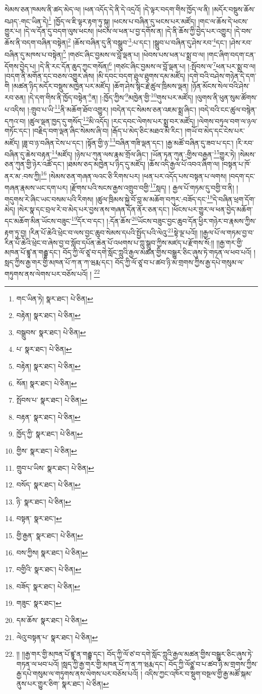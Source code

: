 སེམས་ཅན་ཁམས་ནི་ཚད་མེད་ལ། །ཕན་འདོད་དེ་ནི་དེ་འདྲའོ། །དེ་ལྟར་བདག་གིས་ཁྱོད་ལ་ནི། །མདོར་བསྡུས་ཆོས་བཤད་:གང་ཡིན་དེ།\footnote{གང་ཡིན་ཏེ།  སྣར་ཐང་།  པེ་ཅིན། } །ཁྱོད་ལ་ཇི་ལྟར་རྟག་ཏུ་སྐུ། །ཕངས་པ་བཞིན་དུ་ཕངས་པར་མཛོད། །གང་ལ་ཆོས་དེ་ཕངས་གྱུར་པ། །དེ་ལ་དོན་དུ་བདག་ལུས་ཕངས། །ཕངས་ལ་ཕན་པ་བྱ་དགོས་ན། །དེ་ནི་ཆོས་ཀྱི་བྱེད་པར་འགྱུར། །དེ་བས་ཆོས་ནི་བདག་བཞིན་བསྟེན།\footnote{བརྟེན།  སྣར་ཐང་།  པེ་ཅིན། } །ཆོས་བཞིན་དུ་ནི་བསྒྲུབ་\footnote{བསྒྲུབས་  སྣར་ཐང་།  པེ་ཅིན། }:པ་དང་། །སྒྲུབ་པ་བཞིན་དུ་ཤེས་རབ་\footnote{པ་  སྣར་ཐང་།  པེ་ཅིན། }དང་། །ཤེས་རབ་བཞིན་དུ་མཁས་པ་བསྟེན།\footnote{བརྟེན།  སྣར་ཐང་།  པེ་ཅིན། } །གཙང་ཞིང་བྱམས་ལ་བློ་ལྡན་པ། །ཕེབས་པས་ཕན་པ་སྨྲ་བ་ལ། །གང་ཞིག་བདག་ངན་དོགས་བྱེད་པ། །དེ་ནི་རང་དོན་ཆུད་ཀྱང་གསོན།\footnote{སོན།  སྣར་ཐང་།  པེ་ཅིན། } །གཙང་ཞིང་བྱམས་ལ་བློ་ལྡན་པ། །:སྤོབས་ལ་\footnote{སྤོབས་པ་  སྣར་ཐང་།  པེ་ཅིན། }ཕན་པར་སྨྲ་བ་ལ། །བདག་ནི་མགོན་དང་བཅས་འགྱུར་ཞེས། །མི་དབང་བདག་ཐུལ་ཐུགས་དམ་མཛོད། །དགེ་བའི་བཤེས་གཉེན་དེ་དག་གི །མཚན་ཉིད་མདོར་བསྡུས་མཁྱེན་པར་མཛོད། །ཆོག་ཤེས་སྙིང་རྗེ་ཚུལ་ཁྲིམས་ལྡན། །ཉོན་མོངས་སེལ་བའི་ཤེས་རབ་ཅན། །དེ་དག་གིས་ནི་ཁྱོད་བསྟེན་\footnote{བརྟན་  སྣར་ཐང་།  པེ་ཅིན། }ན། །:ཁྱོད་ཀྱིས་\footnote{ཁྱོད་ཀྱི་  སྣར་ཐང་།  པེ་ཅིན། }མཁྱེན་གྱི་\footnote{གྱིས་  སྣར་ཐང་།  པེ་ཅིན། }གུས་པར་མཛོད། །ལུགས་ནི་ཕུན་སུམ་ཚོགས་པ་འདིས། །:གྲུབ་པ་ཡི་\footnote{གྲུབ་པ་ཡིས་  སྣར་ཐང་།  པེ་ཅིན། }ནི་མཆོག་ཐོབ་འགྱུར། །བདེན་དང་སེམས་ཅན་འཇམ་སྨྲ་ཞིང་། །བདེ་བའི་ངང་ཚུལ་བསྙེན་དཀའ་བ། །ཚུལ་ལྡན་ཁྱད་དུ་གསོད་\footnote{བསོད་  སྣར་ཐང་།  པེ་ཅིན། }མི་འདོད། །རང་དབང་ལེགས་པར་སྨྲ་བར་མཛོད། །ལེགས་བཏུལ་བག་ལ་ཉལ་གཏོང་དང་། །བརྗིད་བག་ལྡན་ཞིང་སེམས་ཞི་བ། །རྒོད་པ་མེད་ཅིང་མཐའ་མི་རིང་། །གཡོ་བ་མེད་དང་ངེས་པར་མཛོད། །ཟླ་བ་ཉ་བཞིན་ངེས་པ་དང་། །སྟོན་གྱི་ཉ་\footnote{ཉི་  སྣར་ཐང་།  པེ་ཅིན། }བཞིན་གཟི་ལྡན་དང་། །རྒྱ་མཚོ་བཞིན་དུ་ཟབ་པ་དང་། །རི་རབ་བཞིན་དུ་ཆེས་བརྟན་\footnote{བསྟན་  སྣར་ཐང་། }མཛོད། །ཉེས་པ་ཀུན་ལས་རྣམ་གྲོལ་ཞིང་། །ཡོན་ཏན་ཀུན་:གྱིས་བརྒྱན་\footnote{གྱི་རྒྱན་  སྣར་ཐང་།  པེ་ཅིན། }གྱུར་ཏེ། །སེམས་ཅན་ཀུན་གྱི་ཉེར་འཚོ་དང་། །ཐམས་ཅད་མཁྱེན་པ་ཉིད་དུ་མཛོད། །ཆོས་འདི་རྒྱལ་པོ་འབའ་ཞིག་ལ། །བསྟན་པ་ཁོ་ནར་མ་:བས་ཀྱི།\footnote{བས་ཀྱིས།  སྣར་ཐང་།  པེ་ཅིན། } །སེམས་ཅན་གཞན་ལའང་ཅི་རིགས་པར། །ཕན་པར་འདོད་པས་བསྟན་པ་ལགས། །བདག་དང་གཞན་རྣམས་ཡང་དག་པར། །རྫོགས་པའི་སངས་རྒྱས་འགྲུབ་བགྱི་\footnote{བགྱིའི་  སྣར་ཐང་།  པེ་ཅིན། }སླད། །
རྒྱལ་པོ་གཏམ་དུ་བགྱི་བ་ནི། །གདུགས་རེ་ཞིང་ཡང་བསམ་པའི་རིགས། །ཚུལ་ཁྲིམས་སྐྱེ་བོ་བླ་མ་མཆོག་བཀུར་:བཟོད་དང་\footnote{བཟོད་  སྣར་ཐང་།  པེ་ཅིན། }དེ་བཞིན་ཕྲག་དོག་མེད། །སེར་སྣ་དང་བྲལ་རེ་བ་མེད་པར་བྱས་ནས་གཞན་དོན་ནོར་ཅན་དང་། །ཕོངས་པར་གྱུར་ལ་ཕན་བྱེད་མཆོག་དང་མཆོག་མིན་ཡོངས་བཟུང་\footnote{གཟུང་  སྣར་ཐང་། }དོར་བ་དང་། །:དོན་ཆོས་\footnote{དམ་ཆོས་  སྣར་ཐང་།  པེ་ཅིན། }ཡོངས་བཟུང་བྱང་ཆུབ་དོན་ཕྱིར་གཉེར་བ་རྣམས་ཀྱིས་རྟག་ཏུ་བྱ། །རིན་པོ་ཆེའི་ཕྲེང་བ་ལས་བྱང་ཆུབ་སེམས་དཔའི་སྤྱོད་པའི་ལེའུ་\footnote{ལེའུ་བསྟན་པ་  སྣར་ཐང་།  པེ་ཅིན། }སྟེ་ལྔ་པའོ།། །།རྒྱལ་པོ་ལ་གཏམ་བྱ་བ་རིན་པོ་ཆེའི་ཕྲེང་བ་ཞེས་བྱ་བ་སློབ་དཔོན་ཆེན་པོ་འཕགས་པ་ཀླུ་སྒྲུབ་ཀྱིས་མཛད་པ་རྫོགས་སོ:།། །།རྒྱ་གར་གྱི་མཁན་པོ་ཛྙཱ་ན་གརྦྷ་དང་། བོད་ཀྱི་ལོ་ཙཱ་བ་དགེ་སློང་ཀླུའི་རྒྱལ་མཚན་གྱིས་བསྒྱུར་ཅིང་ཞུས་ཏེ་གཏན་ལ་ཕབ་པའོ། །སླད་ཀྱིས་རྒྱ་གར་གྱི་མཁན་པོ་ཀ་ན་ཀ་ཝརྨ་དང་། བོད་ཀྱི་ལོ་ཙཱ་བ་པ་ཚབ་ཉི་མ་གྲགས་ཀྱིས་རྒྱ་དཔེ་གསུམ་ལ་གཏུགས་ནས་ལེགས་པར་བཅོས་པའོ། ། \footnote{།། །།རྒྱ་གར་གྱི་མཁན་པོ་ཛྙཱ་ན་གརྦྷ་དང་། བོད་ཀྱི་ལོ་ཙ་བ་དགེ་སློང་ཀླུའི་རྒྱལ་མཚན་གྱིས་བསྒྱུར་ཅིང་ཞུས་ཏེ་གཏན་ལ་ཕབ་པའོ། །སླད་ཀྱི་རྒྱ་གར་གྱི་མཁན་པོ་ཀ་ན་ཀ་ཝརྨ་དང་། བོད་ཀྱི་ལོཙྖ་བ་པ་ཚབ་ཉི་མ་གྲགས་ཀྱིས་རྒྱ་དཔེ་གསུམ་ལ་གཏུགས་ནས་ལེགས་པར་བཅོས་པའོ། ། འདིས་ཀྱང་འཁོར་བ་སྡུག་བསྔལ་གྱི་རྒྱ་མཚོ་སྐམ་ནུས་པར་གྱུར་ཅིག་  སྣར་ཐང་།  པེ་ཅིན། }